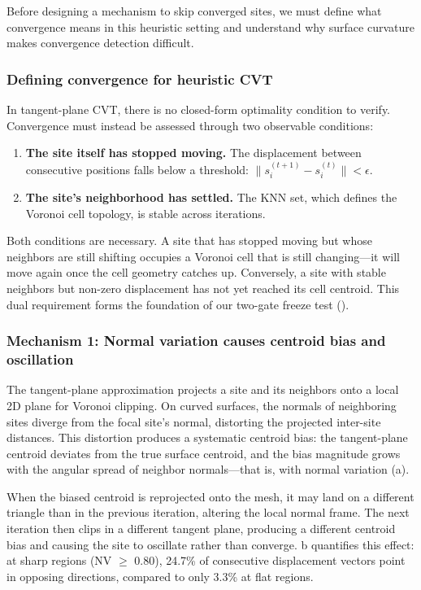 Before designing a mechanism to skip converged sites, we must define what convergence means in this heuristic setting and understand why surface curvature makes convergence detection difficult.

\subsubsection{Defining convergence for heuristic CVT}

In tangent-plane CVT, there is no closed-form optimality condition to verify. Convergence must instead be assessed through two observable conditions:

\begin{enumerate}
    \item \textbf{The site itself has stopped moving.} The displacement between consecutive positions falls below a threshold: $\|s_i^{(t+1)} - s_i^{(t)}\| < \epsilon$.
    \item \textbf{The site's neighborhood has settled.} The KNN set, which defines the Voronoi cell topology, is stable across iterations.
\end{enumerate}

Both conditions are necessary. A site that has stopped moving but whose neighbors are still shifting occupies a Voronoi cell that is still changing---it will move again once the cell geometry catches up. Conversely, a site with stable neighbors but non-zero displacement has not yet reached its cell centroid. This dual requirement forms the foundation of our two-gate freeze test ().

\subsubsection{Mechanism 1: Normal variation causes centroid bias and oscillation}

The tangent-plane approximation projects a site and its neighbors onto a local 2D plane for Voronoi clipping. On curved surfaces, the normals of neighboring sites diverge from the focal site's normal, distorting the projected inter-site distances. This distortion produces a systematic centroid bias: the tangent-plane centroid deviates from the true surface centroid, and the bias magnitude grows with the angular spread of neighbor normals---that is, with normal variation (a).

When the biased centroid is reprojected onto the mesh, it may land on a different triangle than in the previous iteration, altering the local normal frame. The next iteration then clips in a different tangent plane, producing a different centroid bias and causing the site to oscillate rather than converge. b quantifies this effect: at sharp regions (NV $\geq$ 0.80), 24.7\% of consecutive displacement vectors point in opposing directions, compared to only 3.3\% at flat regions.

